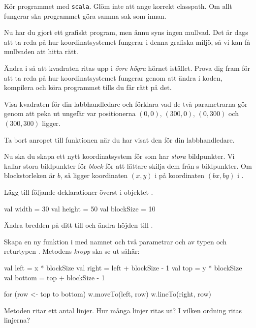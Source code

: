 \Subtask
Kör programmet  med \texttt{scala}.
Glöm inte att ange korrekt classpath.
Om allt fungerar ska programmet göra samma sak som innan.

\Task
Nu har du gjort ett grafiskt program, men ännu syns ingen mullvad.
Det är dags att ta reda på hur koordinatsystemet fungerar i denna grafiska miljö, så vi kan få mullvaden att hitta rätt.

\Subtask
Ändra i  så att kvadraten ritas upp i \emph{övre högra} hörnet istället.
Prova dig fram för att ta reda på hur koordinatsystemet fungerar genom att ändra i koden, kompilera och köra programmet tills du får rätt på det.

\Subtask\Checkpoint
Visa kvadraten för din labbhandledare och förklara vad de två parametrarna gör genom att peka ut ungefär var positionerna $(0,0)$, $(300, 0)$, $(0, 300)$ och $(300, 300)$ ligger.

\Subtask
Ta bort anropet till funktionen  när du har visat den för din labbhandledare.

\Task
Nu ska du skapa ett nytt koordinatsystem för  som har \emph{stora} bildpunkter.
Vi kallar  stora bildpunkter för \emph{block} för att lättare skilja dem från s bildpunkter.
Om blockstorleken är $b$, så ligger koordinaten $(x, y)$ i  på koordinaten $(bx, by)$ i .

\Subtask
Lägg till följande deklarationer överst i objektet .
\begin{Code}
val width = 30
val height = 50
val blockSize = 10
\end{Code}
Ändra bredden på ditt  till  och ändra höjden till .

\Subtask
Skapa en ny funktion i  med namnet  och två parametrar  och  av typen  och returtypen .
Metodens \emph{kropp} ska se ut såhär:
\begin{Code}
{
    val left = x * blockSize
    val right = left + blockSize - 1
    val top = y * blockSize
    val bottom = top + blockSize - 1

    for (row <- top to bottom) {
      w.moveTo(left, row)
      w.lineTo(right, row)
    }
}
\end{Code}

\Subtask\Pen
Metoden  ritar ett antal linjer.
Hur många linjer ritas ut?
I vilken ordning ritas linjerna?

